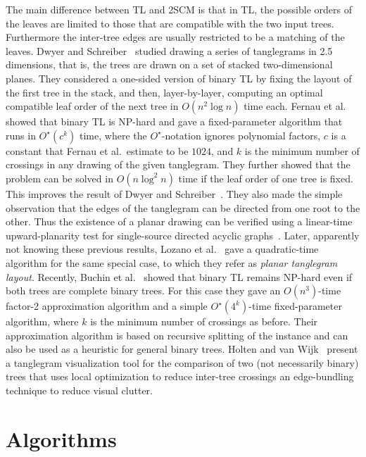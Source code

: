 \documentclass[runningheads,a4paper]{llncs}
\begin{document}
The main difference between TL and 2SCM is that in TL, the possible orders
of the leaves are limited to those that are compatible with the two
input trees. Furthermore the inter-tree edges are usually restricted
to be a matching of the leaves.  Dwyer and
Schreiber~\cite{ds-oloth-04} studied drawing a series of tanglegrams
in 2.5 dimensions, that is, the trees are drawn on a set of stacked
two-dimensional planes. They considered a one-sided version of
binary TL by fixing the layout of the first tree in the stack, and
then, layer-by-layer, computing an optimal compatible leaf order of
the next tree in $O(n^2 \log n)$ time each.  
Fernau et al.~\cite{fkp-ctvcm-05} showed
that binary TL is NP-hard and gave a fixed-parameter algorithm that runs in
$O^\star(c^k)$ time, where the $O^\star$-notation ignores polynomial
factors, $c$ is a constant that Fernau et al.\ estimate to
be $1024$, and $k$ is the minimum number of crossings in any drawing
of the given tanglegram.  They further showed that the problem can
be solved in $O(n \log^2 n)$ time if the leaf order of one tree is
fixed.  This improves the result of Dwyer and
Schreiber~\cite{ds-oloth-04}.  They also made the simple observation
that the edges of the tanglegram can be directed from one root to
the other.  Thus the existence of a planar drawing can be verified
using a linear-time upward-planarity test for single-source directed
acyclic graphs~\cite{bdmt-dupts-98}.  Later, apparently not knowing
these previous results, Lozano et al.~\cite{lprvz-stapt-07} gave a
quadratic-time algorithm for the same special case, to which they
refer as \emph{planar tanglegram layout}.  Recently, Buchin et
al.~\cite{bbbnow-dbtha-08} showed that binary TL remains NP-hard even if
both trees are complete binary trees. For this case they gave an
$O(n^3)$-time factor-2 approximation algorithm and a simple
$O^\star(4^k)$-time fixed-parameter algorithm, where $k$ is the
minimum number of crossings as before. Their approximation algorithm
is based on recursive splitting of the instance and can also be used
as a heuristic for general binary trees.  Holten and van
Wijk~\cite{hw-vchod-08} present a tanglegram visualization
tool for the comparison of two (not necessarily binary) trees that
uses local optimization to reduce inter-tree crossings
an edge-bundling technique to reduce visual clutter.


\section{Algorithms}\label{sec:algorithms}
\end{document}
